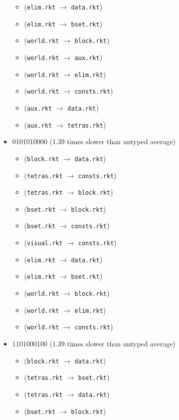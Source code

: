 \documentclass{article}
\newcommand{\mono}[1]{\texttt{#1}}
\begin{document}
\begin{itemize}
\begin{itemize}
  \item (\mono{elim.rkt} $\rightarrow$ \mono{data.rkt})
  \item (\mono{elim.rkt} $\rightarrow$ \mono{bset.rkt})
  \item (\mono{world.rkt} $\rightarrow$ \mono{block.rkt})
  \item (\mono{world.rkt} $\rightarrow$ \mono{aux.rkt})
  \item (\mono{world.rkt} $\rightarrow$ \mono{elim.rkt})
  \item (\mono{world.rkt} $\rightarrow$ \mono{consts.rkt})
  \item (\mono{aux.rkt} $\rightarrow$ \mono{data.rkt})
  \item (\mono{aux.rkt} $\rightarrow$ \mono{tetras.rkt})
  \end{itemize}
\item 0101010000 (1.39 times slower than untyped average)
  \begin{itemize}
  \item (\mono{block.rkt} $\rightarrow$ \mono{data.rkt})
  \item (\mono{tetras.rkt} $\rightarrow$ \mono{consts.rkt})
  \item (\mono{tetras.rkt} $\rightarrow$ \mono{block.rkt})
  \item (\mono{bset.rkt} $\rightarrow$ \mono{block.rkt})
  \item (\mono{bset.rkt} $\rightarrow$ \mono{consts.rkt})
  \item (\mono{visual.rkt} $\rightarrow$ \mono{consts.rkt})
  \item (\mono{elim.rkt} $\rightarrow$ \mono{data.rkt})
  \item (\mono{elim.rkt} $\rightarrow$ \mono{bset.rkt})
  \item (\mono{world.rkt} $\rightarrow$ \mono{block.rkt})
  \item (\mono{world.rkt} $\rightarrow$ \mono{elim.rkt})
  \item (\mono{world.rkt} $\rightarrow$ \mono{consts.rkt})
  \end{itemize}
\item 1101000100 (1.39 times slower than untyped average)
  \begin{itemize}
  \item (\mono{block.rkt} $\rightarrow$ \mono{data.rkt})
  \item (\mono{tetras.rkt} $\rightarrow$ \mono{bset.rkt})
  \item (\mono{tetras.rkt} $\rightarrow$ \mono{data.rkt})
  \item (\mono{bset.rkt} $\rightarrow$ \mono{block.rkt})

\end{itemize}
\end{itemize}
\end{document}
